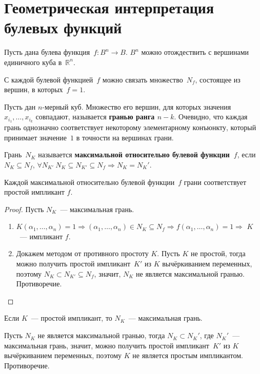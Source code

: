 \section{Геометрическая интерпретация булевых функций}
Пусть дана булева функция~$f \colon B^n \to B$.
$B^n$ можно отождествить с вершинами единичного куба в~$\mathbb R^n$.

С каждой булевой функцией~$f$ можно связать множество~$N_f$, состоящее из вершин, в которых~$f = 1$.

Пусть дан $n$-мерный куб.
 Множество его вершин, для которых значения~$x_{i_1}, \ldots, x_{i_k}$ совпадают, называется \textbf{гранью ранга $n - k$}.
Очевидно, что каждая грань однозначно соответствует некоторому элементарному конъюнкту, который принимает значение~$1$ в точности на вершинах грани.

Грань~$N_K$ называется \textbf{максимальной относительно булевой функции~$f$}, если $N_K \subseteq N_f$, $\forall N_{K'} \ N_K \subseteq N_{K'} \subseteq N_f \Rightarrow N_K = N_K'$.

\begin{statement}
Каждой максимальной относительно булевой функции~$f$ грани соответствует простой импликант $f$.
\end{statement}
\begin{proof}
Пусть $N_K$~--- максимальная грань.
\begin{enumerate}
	\item $K(\alpha_1, \ldots, \alpha_n) = 1 \Rightarrow
	(\alpha_1, \ldots, \alpha_n) \in N_K \subseteq N_f \Rightarrow
	f(\alpha_1, \ldots, \alpha_n) = 1 \Rightarrow$
	$K$~--- импликант $f$.
	
	\item Докажем методом от противного простоту $K$.
	Пусть $K$ не простой, тогда можно получить простой импликант~$K'$ из $K$ вычёркиванием переменных, поэтому $N_K \subset N_{K'} \subseteq N_f$, значит, $N_K$ не является максимальной гранью.
	Противоречие.
\end{enumerate}
\end{proof}

\begin{statement}
Если $K$~--- простой импликант, то $N_K$~--- максимальная грань.
\end{statement}
\begin{proofcontra}
Пусть $N_K$ не является максимальной гранью, тогда $N_K \subset N_K'$, где $N_K'$~--- максимальная грань, значит, можно получить простой импликант~$K'$ из $K$ вычёркиванием переменных, поэтому $K$ не является простым импликантом.
Противоречие.
\end{proofcontra}

